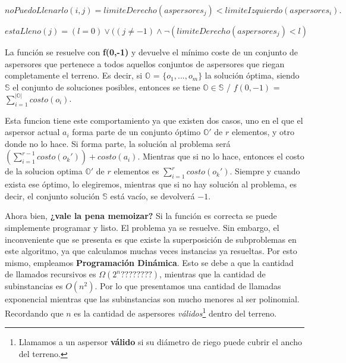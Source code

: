 \documentclass[./main.tex]{subfiles}
\begin{document}
\begin{equation}
 \label{función para ver si se puede llenar el terreno entre medio de los aspersores i,j}
 noPuedoLlenarlo(i,j) = limiteDerecho(aspersores_j) < limiteIzquierdo(aspersores_i). 
\end{equation}

\begin{equation}
 \label{función para ver si con el aspersor actual se cubre el final del terreno}
 estaLleno(j) = (l = 0) \lor ((j \neq -1) \land \neg(limiteDerecho(aspersores_j) < l) 
\end{equation}


La función se resuelve con \textbf{f(0,-1)} y devuelve el mínimo coste de un conjunto de aspersores que pertenece a todos aquellos conjuntos de aspersores que riegan completamente el terreno. Es decir, si $\mathbb{O}$ = $\lbrace o_1,...,o_m  \rbrace$ la solución óptima, siendo $\mathbb{S}$ el conjunto de soluciones posibles, entonces se tiene $\mathbb{O} \in \mathbb{S}$ / $f(0,-1)$ = $\sum_{i=1}^{|\mathbb{O}|}costo(o_{i})$.
\newline

Esta funcion tiene este comportamiento ya que existen dos casos, uno en el que el aspersor actual $a_i$ forma parte de un conjunto óptimo $\mathbb{O}'$ de $r$ elementos, y otro donde no lo hace. Si forma parte, la solución al problema será $(\sum_{i=1}^{r-1}costo(o_{k}')) + costo(a_i)$. Mientras que si no lo hace, entonces el costo de la solucion optima $\mathbb{O}'$  de $r$ elementos es $\sum_{i=1}^{r}costo(o_{k}')$. Siempre y cuando exista ese óptimo, lo elegiremos, mientras que si no hay solución al problema, es decir, el conjunto solución $\mathbb{S}$ está vacío, se devolverá $-1$.  
\newline

Ahora bien, \textbf{¿vale la pena memoizar?} Si la función es correcta se puede simplemente programar y listo. El problema ya se resuelve. Sin embargo, el inconveniente que se presenta es que existe la superposición de subproblemas en este algoritmo, ya que calculamos muchas veces instancias ya resueltas. Por esto mismo, empleamos \textbf{Programación Dinámica}. Esto se debe a que la cantidad de llamados recursivos es $\Omega(2^{n}????????)$, mientras que la cantidad de subinstancias es ${O(n^2)}$. Por lo que presentamos una cantidad de llamadas exponencial mientras que las subinstancias son mucho menores al ser polinomial. Recordando que $n$ es la cantidad de aspersores \textit{válidos}\footnote{Llamamos a un aspersor \textbf{válido} si su diámetro de riego puede cubrir el ancho del terreno.} dentro del terreno.
\newline
\end{document}
